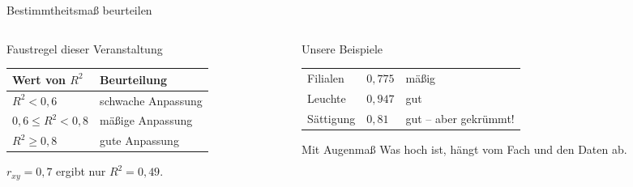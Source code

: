 \documentclass[aspectratio=169,11pt]{beamer}
\begin{document}
\begin{frame}{Bestimmtheitsmaß beurteilen}
  \begin{columns}[T]
    \begin{column}{0.48\textwidth}
      \begin{block}{Faustregel dieser Veranstaltung}
        \begin{center}
          \renewcommand{\arraystretch}{1.2}
          \begin{tabular}{ll}
            \toprule
            \textbf{Wert von $R^{2}$} & \textbf{Beurteilung} \\
            \midrule
            $R^{2} < 0{,}6$           & schwache Anpassung \\
            $0{,}6 \le R^{2} < 0{,}8$ & mäßige Anpassung \\
            $R^{2} \ge 0{,}8$         & gute Anpassung \\
            \bottomrule
          \end{tabular}
        \end{center}
      \end{block}
      \smallskip
      $r_{xy} = 0{,}7$ ergibt nur $R^{2} = 0{,}49$.
    \end{column}
    \begin{column}{0.5\textwidth}
      \begin{exampleblock}{Unsere Beispiele}
        \renewcommand{\arraystretch}{1.2}
        \begin{tabular}{@{}lll@{}}
          Filialen   & $0{,}775$ & mäßig \\
          Leuchte    & $0{,}947$ & gut \\
          Sättigung  & $0{,}81$  & gut -- aber gekrümmt!
        \end{tabular}
      \end{exampleblock}
      \begin{alertblock}{Mit Augenmaß}
        Was \glqq hoch\grqq{} ist, hängt vom Fach und den Daten ab.
      \end{alertblock}
    \end{column}
  \end{columns}
\end{frame}
\end{document}
